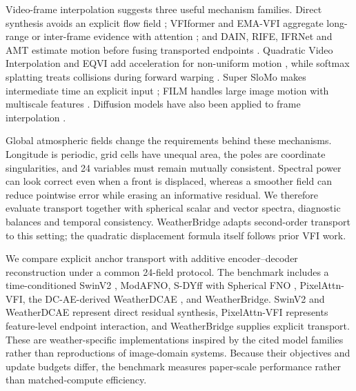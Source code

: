\documentclass[referee,lineno,pdflatex,sn-nature]{sn-jnl}
\begin{document}
Video-frame interpolation suggests three useful mechanism families. Direct
synthesis avoids an explicit flow field \cite{kalluri2023flavr}; VFIformer and
EMA-VFI aggregate long-range or inter-frame evidence with attention
\cite{shi2022vfiformer,zhang2023emavfi}; and DAIN, RIFE, IFRNet and AMT estimate
motion before fusing transported endpoints
\cite{bao2019dain,huang2022rife,kong2022ifrnet,li2023amt}. Quadratic Video Interpolation
and EQVI add acceleration for non-uniform motion
\cite{xu2019qvi,liu2020eqvi}, while softmax splatting treats collisions during
forward warping \cite{niklaus2020softmax}.
Super SloMo makes intermediate time an explicit input
\cite{jiang2018superslomo}; FILM handles large image motion with multiscale
features \cite{reda2022film}. Diffusion models have also been applied to
frame interpolation \cite{voleti2022mcvd,danier2024ldmvfi}.

Global atmospheric fields change the requirements behind these mechanisms.
Longitude is periodic, grid cells have unequal area, the poles are coordinate
singularities, and 24 variables must remain mutually consistent. Spectral
power can look correct even when a front is displaced, whereas a smoother
field can reduce pointwise error while erasing an informative residual. We
therefore evaluate transport together with spherical scalar and vector
spectra, diagnostic balances and temporal consistency. WeatherBridge adapts
second-order transport to this setting; the quadratic displacement formula
itself follows prior VFI work.

We compare explicit anchor transport with additive encoder--decoder
reconstruction under a common 24-field protocol. The benchmark includes a
time-conditioned SwinV2 \cite{liu2022swinv2}, ModAFNO, S-DYff with Spherical
FNO \cite{bonev2023sfno}, PixelAttn-VFI, the DC-AE-derived WeatherDCAE
\cite{cai2024dcae}, and WeatherBridge. SwinV2 and WeatherDCAE represent direct
residual synthesis, PixelAttn-VFI represents feature-level endpoint
interaction, and WeatherBridge supplies explicit transport. These are
weather-specific implementations inspired by the cited model families rather
than reproductions of image-domain systems. Because their objectives and
update budgets differ, the benchmark measures paper-scale performance rather
than matched-compute efficiency.
\end{document}
